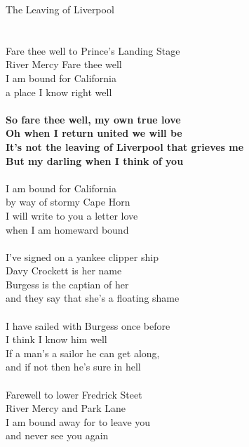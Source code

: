 \documentclass[letterpaper,9pt]{article}
\begin{document}
\newpage
{}
\huge
The Leaving of Liverpool\\
\\
\Large
\noindent
\\Fare thee well to Prince's Landing Stage
\\River Mercy Fare thee well
\\I am bound for California
\\a place I know right well
\\
\\\textbf{So fare thee well, my own true love
\\Oh when I return united we will be
\\It's not the leaving of Liverpool that grieves me
\\But my darling when I think of you}
\\
\\I am bound for California
\\by way of stormy Cape Horn
\\I will write to you a letter love
\\when I am homeward bound
\\
\\I've signed on a yankee clipper ship
\\Davy Crockett is her name
\\Burgess is the captian of her
\\and they say that she's a floating shame
\\
\\I have sailed with Burgess once before
\\I think I know him well
\\If a man's a sailor he can get along,
\\and if not then he's sure in hell
\\
\\Farewell to lower Fredrick Steet
\\River Mercy and Park Lane
\\I am bound away for to leave you
\\and never see you again
\end{document}
